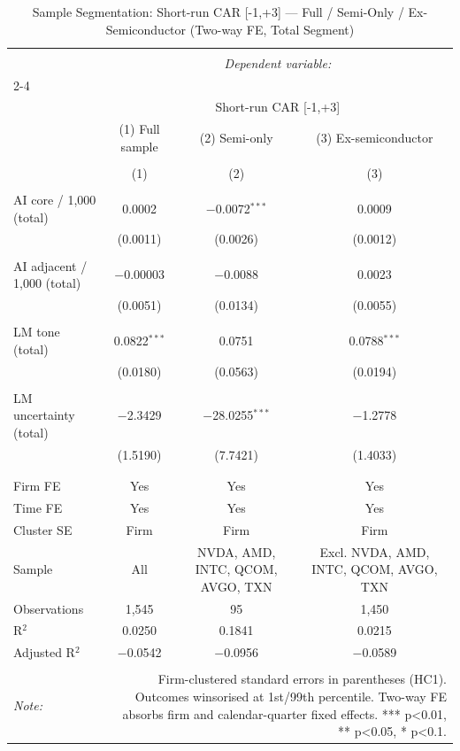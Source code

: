 
\begin{table}[!htbp] \centering 
  \caption{Sample Segmentation: Short-run CAR [-1,+3] — Full / Semi-Only / Ex-Semiconductor (Two-way FE, Total Segment)} 
  \label{} 
\begin{tabular}{@{\extracolsep{5pt}}lccc} 
\\[-1.8ex]\hline 
\hline \\[-1.8ex] 
 & \multicolumn{3}{c}{\textit{Dependent variable:}} \\ 
\cline{2-4} 
\\[-1.8ex] & \multicolumn{3}{c}{Short-run CAR [-1,+3]} \\ 
 & (1) Full sample & (2) Semi-only & (3) Ex-semiconductor \\ 
\\[-1.8ex] & (1) & (2) & (3)\\ 
\hline \\[-1.8ex] 
 AI core / 1,000 (total) & 0.0002 & $-$0.0072$^{***}$ & 0.0009 \\ 
  & (0.0011) & (0.0026) & (0.0012) \\ 
  & & & \\ 
 AI adjacent / 1,000 (total) & $-$0.00003 & $-$0.0088 & 0.0023 \\ 
  & (0.0051) & (0.0134) & (0.0055) \\ 
  & & & \\ 
 LM tone (total) & 0.0822$^{***}$ & 0.0751 & 0.0788$^{***}$ \\ 
  & (0.0180) & (0.0563) & (0.0194) \\ 
  & & & \\ 
 LM uncertainty (total) & $-$2.3429 & $-$28.0255$^{***}$ & $-$1.2778 \\ 
  & (1.5190) & (7.7421) & (1.4033) \\ 
  & & & \\ 
\hline \\[-1.8ex] 
Firm FE & Yes & Yes & Yes \\ 
Time FE & Yes & Yes & Yes \\ 
Cluster SE & Firm & Firm & Firm \\ 
Sample & All & NVDA, AMD, INTC, QCOM, AVGO, TXN & Excl. NVDA, AMD, INTC, QCOM, AVGO, TXN \\ 
Observations & 1,545 & 95 & 1,450 \\ 
R$^{2}$ & 0.0250 & 0.1841 & 0.0215 \\ 
Adjusted R$^{2}$ & $-$0.0542 & $-$0.0956 & $-$0.0589 \\ 
\hline 
\hline \\[-1.8ex] 
\textit{Note:}  & \multicolumn{3}{r}{Firm-clustered standard errors in parentheses (HC1). Outcomes winsorised at 1st/99th percentile. Two-way FE absorbs firm and calendar-quarter fixed effects. *** p<0.01, ** p<0.05, * p<0.1.} \\ 
\end{tabular} 
\end{table} 
